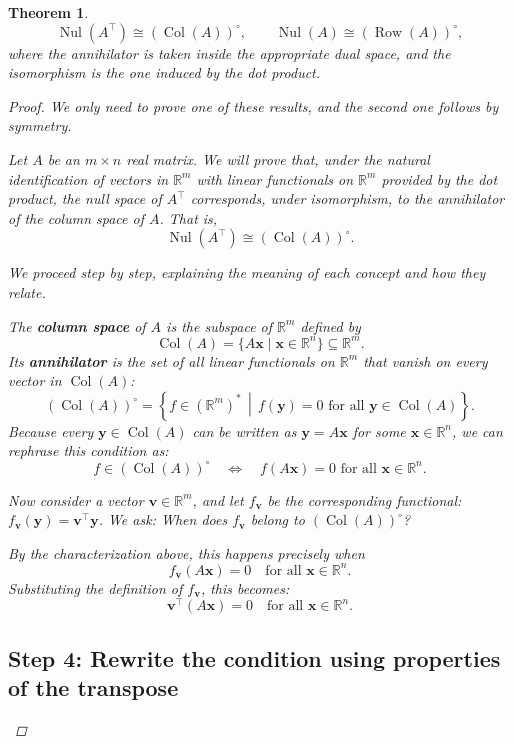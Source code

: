 \documentclass[11pt]{article}
\newcommand{\nul}{\operatorname{Nul}}
\newcommand{\col}{\operatorname{Col}}
\newcommand{\row}{\operatorname{Row}}
\newcommand{\R}{\mathbb{R}}
\newtheorem{theorem}{Theorem}
\begin{document}
\begin{theorem} 
\[
\nul(A^\top) \cong (\col(A))^\circ, \qquad
\nul(A) \cong (\row(A))^\circ,
\]
where the annihilator is taken inside the appropriate dual space, and the isomorphism is the one induced by the dot product.
\begin{proof}
\medskip

We only need to prove one of these results, and the second one follows by symmetry.

Let $A$ be an $m \times n$ real matrix. We will prove that, under the natural identification of vectors in $\R^m$ with linear functionals on $\R^m$ provided by the dot product, the null space of $A^\top$ corresponds, under isomorphism, to the annihilator of the column space of $A$. That is,
\[
\nul(A^\top) \cong (\col(A))^\circ.
\]

We proceed step by step, explaining the meaning of each concept and how they relate.


The \textbf{column space} of $A$ is the subspace of $\R^m$ defined by
\[
\col(A) = \{ A\mathbf{x} \mid \mathbf{x} \in \R^n \} \subseteq \R^m.
\]
Its \textbf{annihilator} is the set of all linear functionals on $\R^m$ that vanish on every vector in $\col(A)$:
\[
(\col(A))^\circ = \left\{ f \in (\R^m)^* \,\middle|\, f(\mathbf{y}) = 0 \text{ for all } \mathbf{y} \in \col(A) \right\}.
\]
Because every $\mathbf{y} \in \col(A)$ can be written as $\mathbf{y} = A\mathbf{x}$ for some $\mathbf{x} \in \R^n$, we can rephrase this condition as:
\[
f \in (\col(A))^\circ \quad \Longleftrightarrow \quad f(A\mathbf{x}) = 0 \text{ for all } \mathbf{x} \in \R^n.
\]

Now consider a vector $\mathbf{v} \in \R^m$, and let $f_{\mathbf{v}}$ be the corresponding functional: $f_{\mathbf{v}}(\mathbf{y}) = \mathbf{v}^\top \mathbf{y}$.  
We ask: \textit{When does $f_{\mathbf{v}}$ belong to $(\col(A))^\circ$?}

By the characterization above, this happens precisely when
\[
f_{\mathbf{v}}(A\mathbf{x}) = 0 \quad \text{for all } \mathbf{x} \in \R^n.
\]
Substituting the definition of $f_{\mathbf{v}}$, this becomes:
\begin{equation}
\label{eq:annihilator-condition}
\mathbf{v}^\top (A\mathbf{x}) = 0 \quad \text{for all } \mathbf{x} \in \R^n.
\end{equation}

\subsection*{Step 4: Rewrite the condition using properties of the transpose}


\end{proof}
\end{theorem}
\end{document}
